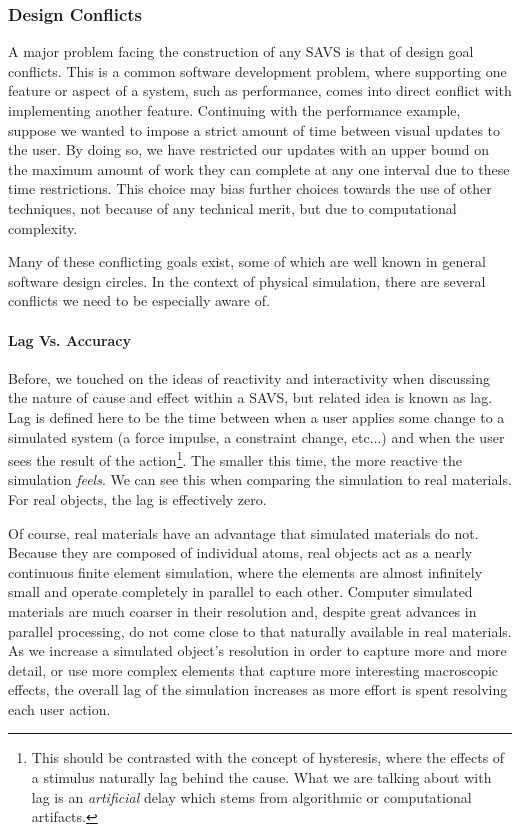 \subsubsection{Design Conflicts}

A major problem facing the construction of any SAVS is that of design
goal conflicts. This is a common software development problem, where
supporting one feature or aspect of a system, such as performance,
comes into direct conflict with implementing another
feature. Continuing with the performance example, suppose we wanted to
impose a strict amount of time between visual updates to the user. By
doing so, we have restricted our updates with an upper bound on the
maximum amount of work they can complete at any one interval due to
these time restrictions. This choice may bias further choices towards
the use of other techniques, not because of any technical merit, but
due to computational complexity.

Many of these conflicting goals exist, some of which are well known in
general software design circles. In the context of physical
simulation, there are several conflicts we need to be especially aware
of.


\paragraph{Lag Vs. Accuracy}
Before, we touched on the ideas of reactivity and interactivity when
discussing the nature of cause and effect within a SAVS, but related
idea is known as lag. Lag is defined here to be the time between when
a user applies some change to a simulated system (a force impulse, a
constraint change, etc...) and when the user sees the result of the
action\footnote{This should be contrasted with the concept of
  hysteresis, where the effects of a stimulus naturally lag behind the
  cause. What we are talking about with lag is an \textit{artificial}
  delay which stems from algorithmic or computational artifacts.}. The
smaller this time, the more reactive the simulation \textit{feels}. We
can see this when comparing the simulation to real materials. For real
objects, the lag is effectively zero.

Of course, real materials have an advantage that simulated materials
do not. Because they are composed of individual atoms, real objects
act as a nearly continuous finite element simulation, where the elements are
almost infinitely small and operate completely in parallel to each
other. Computer simulated materials are much coarser in their
resolution and, despite great advances in parallel processing, do not
come close to that naturally available in real materials. As we
increase a simulated object's resolution in order to capture more and
more detail, or use more complex elements that capture more
interesting macroscopic effects, the overall lag of the
simulation increases as more effort is spent resolving each user
action.


